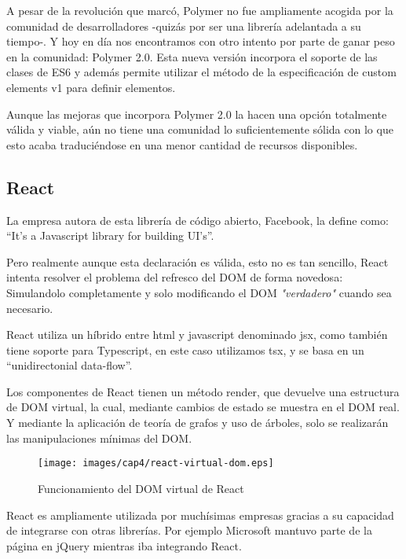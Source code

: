 \bigskip
A pesar de la revolución que marcó, Polymer no fue ampliamente acogida por la comunidad de desarrolladores 
-quizás por ser una librería adelantada a su tiempo-. Y hoy en día nos encontramos con otro intento por 
parte de ganar peso en la comunidad: Polymer 2.0. Esta nueva versión incorpora el soporte de las clases de ES6
y además permite utilizar el método de la especificación de custom elements v1 para definir elementos.

\bigskip
Aunque las mejoras que incorpora Polymer 2.0 la hacen una opción totalmente válida y viable, aún no 
tiene una comunidad lo suficientemente sólida con lo que esto acaba traduciéndose en una menor 
cantidad de recursos disponibles.

\subsection{React}
La empresa autora de esta librería de código abierto, Facebook, la define como: “It’s a Javascript library for building UI’s”.

\bigskip
Pero realmente aunque esta declaración es válida, esto no es tan sencillo, React intenta resolver el problema
 del refresco del DOM de forma novedosa: Simulandolo completamente y solo modificando el DOM \textit{"verdadero"} cuando sea necesario.

\bigskip
React utiliza un híbrido entre html y javascript denominado jsx, como también tiene soporte para 
Typescript, en este caso utilizamos tsx, y se basa en un “unidirectonial data-flow”. 

\bigskip
Los componentes de React tienen un método render, que devuelve una estructura de DOM virtual, la cual, 
mediante cambios de estado se muestra en el DOM real. Y mediante la aplicación de teoría de grafos y uso de árboles,
solo se realizarán las manipulaciones mínimas del DOM.

\begin{figure}[!th]
\begin{center}
\texttt{[image: images/cap4/react-virtual-dom.eps]}
\caption{Funcionamiento del DOM virtual de React}
\label{fig:Funcionamiento del DOM virtual de React}
\end{center}
\end{figure}


\bigskip
React es ampliamente utilizada por muchísimas empresas gracias a su capacidad de integrarse con otras librerías. 
Por ejemplo Microsoft mantuvo parte de la página en jQuery mientras iba integrando React.

